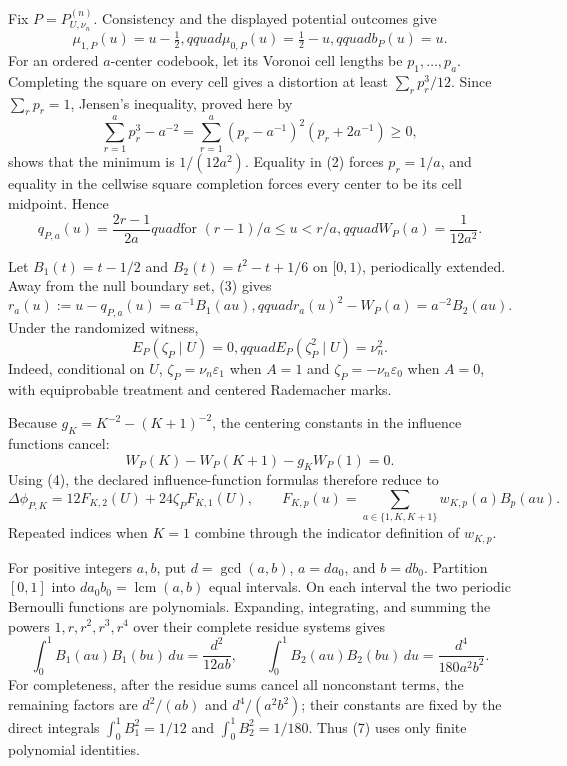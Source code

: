 Fix \(P=P_{U,\nu_n}^{(n)}\).  Consistency and the displayed potential outcomes give
\[
 \mu_{1,P}(u)=u-\tfrac12,qquad \mu_{0,P}(u)=\tfrac12-u,qquad b_P(u)=u.          \tag{1}
\]
For an ordered \(a\)-center codebook, let its Voronoi cell lengths be \(p_1,\ldots,p_a\).  Completing the square on every cell gives a distortion at least \(\sum_rp_r^3/12\).  Since \(\sum_rp_r=1\), Jensen's inequality, proved here by
\[
 \sum_{r=1}^a p_r^3-a^{-2}
 =\sum_{r=1}^a(p_r-a^{-1})^2(p_r+2a^{-1})\geq0,                                \tag{2}
\]
shows that the minimum is \(1/(12a^2)\).  Equality in (2) forces \(p_r=1/a\), and equality in the cellwise square completion forces every center to be its cell midpoint.  Hence
\[
 q_{P,a}(u)=\frac{2r-1}{2a}quad\text{for }(r-1)/a\leq u<r/a,qquad
 W_P(a)=\frac1{12a^2}.                                                            \tag{3}
\]

Let \(B_1(t)=t-1/2\) and \(B_2(t)=t^2-t+1/6\) on \([0,1)\), periodically extended.  Away from the null boundary set, (3) gives
\[
 r_a(u):=u-q_{P,a}(u)=a^{-1}B_1(au),qquad
 r_a(u)^2-W_P(a)=a^{-2}B_2(au).                                                   \tag{4}
\]
Under the randomized witness,
\[
 E_P(\zeta_P\mid U)=0,qquad E_P(\zeta_P^2\mid U)=\nu_n^2.                     \tag{5}
\]
Indeed, conditional on \(U\), \(\zeta_P=\nu_n\varepsilon_1\) when \(A=1\) and \(\zeta_P=-\nu_n\varepsilon_0\) when \(A=0\), with equiprobable treatment and centered Rademacher marks.

Because \(g_K=K^{-2}-(K+1)^{-2}\), the centering constants in the influence functions cancel:
\[
 W_P(K)-W_P(K+1)-g_KW_P(1)=0.
\]
Using (4), the declared influence-function formulas therefore reduce to
\[
 \Delta\phi_{P,K}=12F_{K,2}(U)+24\zeta_PF_{K,1}(U),
 \qquad F_{K,p}(u)=\sum_{a\in\{1,K,K+1\}}w_{K,p}(a)B_p(au).                    \tag{6}
\]
Repeated indices when \(K=1\) combine through the indicator definition of \(w_{K,p}\).

For positive integers \(a,b\), put \(d=\gcd(a,b)\), \(a=da_0\), and \(b=db_0\).  Partition \([0,1]\) into \(da_0b_0=\operatorname{lcm}(a,b)\) equal intervals.  On each interval the two periodic Bernoulli functions are polynomials.  Expanding, integrating, and summing the powers \(1,r,r^2,r^3,r^4\) over their complete residue systems gives
\[
 \int_0^1B_1(au)B_1(bu)\,du=\frac{d^2}{12ab},
 \qquad
 \int_0^1B_2(au)B_2(bu)\,du=\frac{d^4}{180a^2b^2}.                             \tag{7}
\]
For completeness, after the residue sums cancel all nonconstant terms, the remaining factors are \(d^2/(ab)\) and \(d^4/(a^2b^2)\); their constants are fixed by the direct integrals \(\int_0^1B_1^2=1/12\) and \(\int_0^1B_2^2=1/180\).  Thus (7) uses only finite polynomial identities.

